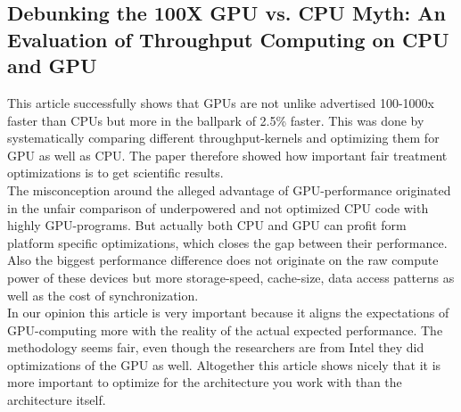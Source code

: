 \subsection{Debunking the 100X GPU vs. CPU Myth: An Evaluation of Throughput Computing on CPU and GPU}
This article successfully shows that GPUs are not unlike advertised 100-1000x faster than CPUs but more in the ballpark of 2.5\% faster. This was done by systematically comparing different throughput-kernels and optimizing them for GPU as well as CPU. The paper therefore showed how important fair treatment optimizations is to get scientific results.\\
The misconception around the alleged advantage of GPU-performance originated in the unfair comparison of underpowered and not optimized CPU code with highly GPU-programs. But actually both CPU and GPU can profit form platform specific optimizations, which closes the gap between their performance. Also the biggest performance difference does not originate on the raw compute power of these devices but more storage-speed, cache-size, data access patterns as well as the cost of synchronization.\\
In our opinion this article is very important because it aligns the expectations of GPU-computing more with the reality of the actual expected performance. The methodology seems fair, even though the researchers are from Intel they did optimizations of the GPU as well. Altogether this article shows nicely that it is more important to optimize for the architecture you work with than the architecture itself.
